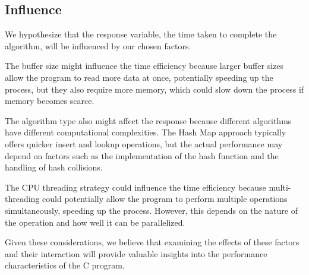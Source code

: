 \documentclass{article}
\begin{document}
\subsection*{Influence}

We hypothesize that the response variable, the time taken to complete the algorithm,
will be influenced by our chosen factors.

The buffer size might influence the time efficiency because larger
buffer sizes allow the program to read more data at once,
potentially speeding up the process, but they also require more memory,
which could slow down the process if memory becomes scarce.

The algorithm type also might affect the response because different
algorithms have different computational complexities.
The Hash Map approach typically offers quicker insert and lookup operations,
but the actual performance may depend on factors such as the
implementation of the hash function and the handling of hash collisions.

The CPU threading strategy could influence the time efficiency because
multi-threading could potentially allow the program to perform multiple
operations simultaneously, speeding up the process. However,
this depends on the nature of the operation and how well it can be parallelized.

Given these considerations,
we believe that examining the effects of these factors and their
interaction will provide valuable insights into the performance
characteristics of the C program.
\end{document}
